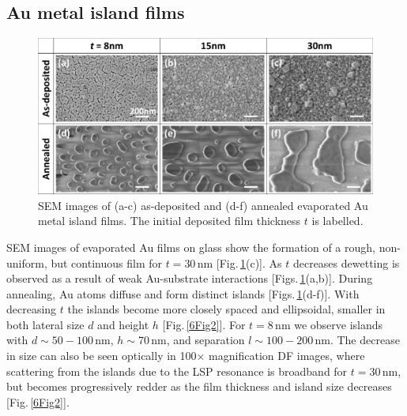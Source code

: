 \subsection{Au metal island films}
\begin{figure}[h!] 
\centering    
\includegraphics[width=\textwidth]{Fig1}
\caption{SEM images of (a-c) as-deposited and (d-f) annealed evaporated Au metal island films. The initial deposited film thickness $t$ is labelled.}
\label{6Fig1}
\end{figure}
SEM images of evaporated Au films on glass show the formation of a rough, non-uniform, but continuous film for $t=30$\,nm [Fig.\,\ref{6Fig1}(c)]. As $t$ decreases dewetting is observed as a result of weak Au-substrate interactions [Figs.\,\ref{6Fig1}(a,b)]. During annealing, Au atoms diffuse and form distinct islands [Figs.\,\ref{6Fig1}(d-f)]. With decreasing $t$ the islands become more closely spaced and ellipsoidal, smaller in both lateral size $d$ and height $h$ [Fig.\,\ref{6Fig2}]. For $t=8$\,nm we observe islands with $d \sim 50-100$\,nm, $h\sim$70\,nm, and separation $l \sim 100-200$\,nm. The decrease in size can also be seen optically in 100$\times$ magnification DF images, where scattering from the islands due to the LSP resonance is broadband for $t=30$\,nm, but becomes progressively redder as the film thickness and island size decreases [Fig.\,\ref{6Fig2}]. 
